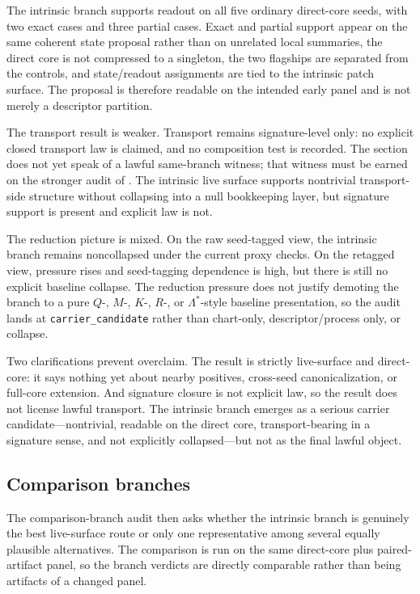 \documentclass[11pt]{article}
\theoremstyle{definition}
\begin{document}
The intrinsic branch supports readout on all five ordinary direct-core seeds, with two
exact cases and three partial cases. Exact and partial support appear on the same
coherent state proposal rather than on unrelated local summaries, the direct core is
not compressed to a singleton, the two flagships are separated from the controls, and
state/readout assignments are tied to the intrinsic patch surface. The proposal is
therefore readable on the intended early panel and is not merely a descriptor
partition.

The transport result is weaker. Transport remains signature-level only: no explicit
closed transport law is claimed, and no composition test is recorded. The section does
not yet speak of a lawful same-branch witness; that witness must be earned on the
stronger audit of . The intrinsic live
surface supports nontrivial transport-side structure without collapsing into a null
bookkeeping layer, but signature support is present and explicit law is not.

The reduction picture is mixed. On the raw seed-tagged view, the intrinsic branch
remains noncollapsed under the current proxy checks. On the retagged view, pressure
rises and seed-tagging dependence is high, but there is still no explicit baseline
collapse. The reduction pressure does not justify demoting the branch to a pure $Q$-,
$M$-, $K$-, $R$-, or $\Lambda^\ast$-style baseline presentation, so the audit lands at
\texttt{carrier\_candidate} rather than chart-only, descriptor/process only, or
collapse.

Two clarifications prevent overclaim. The result is strictly live-surface and
direct-core: it says nothing yet about nearby positives, cross-seed canonicalization,
or full-core extension. And signature closure is not explicit law, so the result does
not license lawful transport. The intrinsic branch emerges as a serious carrier
candidate---nontrivial, readable on the direct core, transport-bearing in a signature
sense, and not explicitly collapsed---but not as the final lawful object.

\subsection{Comparison branches}

The comparison-branch audit then asks whether the intrinsic branch is genuinely the best
live-surface route or only one representative among several equally plausible alternatives.
The comparison is run on the same direct-core plus paired-artifact panel, so the branch
verdicts are directly comparable rather than being artifacts of a changed panel.
\end{document}
